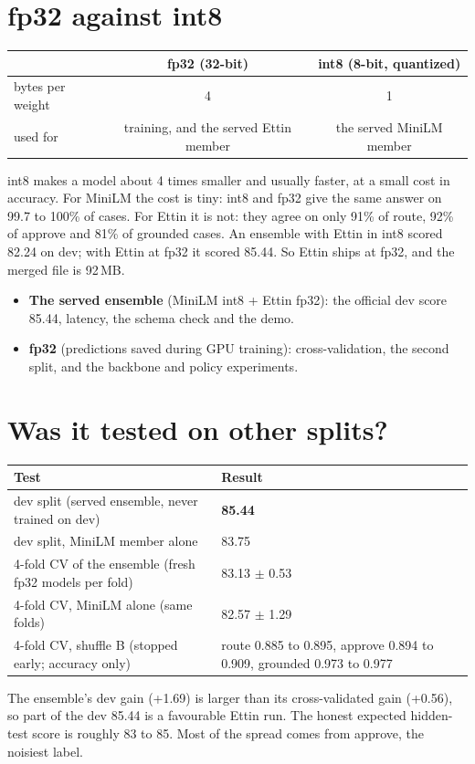 \documentclass[11pt,a4paper]{article}
\begin{document}
\section{fp32 against int8}
\begin{center}
\begin{tabular}{lcc}
\toprule
 & fp32 (32-bit) & int8 (8-bit, quantized) \\
\midrule
bytes per weight & 4 & 1 \\
used for & training, and the served Ettin member & the served MiniLM member \\
\bottomrule
\end{tabular}
\end{center}
int8 makes a model about 4 times smaller and usually faster, at a small cost in accuracy.
For MiniLM the cost is tiny: int8 and fp32 give the same answer on 99.7 to 100\% of cases.
For Ettin it is not: they agree on only 91\% of route, 92\% of approve and 81\% of
grounded cases. An ensemble with Ettin in int8 scored 82.24 on dev; with Ettin at fp32 it
scored 85.44. So Ettin ships at fp32, and the merged file is 92\,MB.

\begin{itemize}
  \item \textbf{The served ensemble} (MiniLM int8 + Ettin fp32): the official dev score
        85.44, latency, the schema check and the demo.
  \item \textbf{fp32} (predictions saved during GPU training): cross-validation, the
        second split, and the backbone and policy experiments.
\end{itemize}

\section{Was it tested on other splits?}
\begin{center}
\noindent\begin{tabularx}{\linewidth}{@{}lL@{}}
\toprule
Test & Result \\
\midrule
dev split (served ensemble, never trained on dev) & \textbf{85.44} \\
dev split, MiniLM member alone & 83.75 \\
4-fold CV of the ensemble (fresh fp32 models per fold) & 83.13 $\pm$ 0.53 \\
4-fold CV, MiniLM alone (same folds) & 82.57 $\pm$ 1.29 \\
4-fold CV, shuffle B (stopped early; accuracy only) & route 0.885 to 0.895, approve 0.894 to 0.909, grounded 0.973 to 0.977 \\
\bottomrule
\end{tabularx}
\end{center}
The ensemble's dev gain (+1.69) is larger than its cross-validated gain (+0.56), so
part of the dev 85.44 is a favourable Ettin run. The honest expected hidden-test score is
roughly 83 to 85. Most of the spread comes from approve, the noisiest label.
\end{document}
